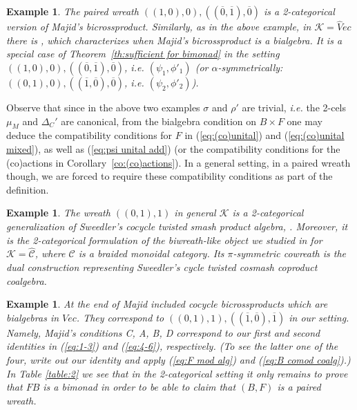 \documentclass[a4paper, 12pt]{article}
\renewcommand{\_}[1]{\mbox{$_{\left( #1 \right)}$}}
\theoremstyle{plain}
\newtheorem{ex}[thm]{Example}
\newcommand{\C}{{\mathcal C}}
\newcommand{\crta}{\overline}
\def\K{{\mathcal K}}  %
\newcommand{\exlabel}[1]{\label{ex:#1}}
\newcommand{\equref}[1]{(\ref{eq:#1})}
\newcommand{\thref}[1]{Theorem~\ref{th:#1}}
\newcommand{\coref}[1]{Corollary~\ref{co:#1}}
\begin{document}
\begin{ex} \exlabel{ex 2}
The paired wreath $((1,0),0), ((\crta 0,\crta 1),\crta 0)$ is a 2-categorical version of Majid's bicrossproduct. 
Similarly, as in the above example, in $\K=\hat Vec$ there is \cite[Theorem 3.3]{Maj5}, which characterizes when Majid's bicrossproduct is a bialgebra. 
It is a special case of \thref{sufficient for bimonad} in 
the setting $((1,0),0), ((\crta 0,\crta 1),\crta 0)$, {\em i.e.}  $(\psi_1, \phi'_1)$ (or $\alpha$-symmetrically: $((0,1),0), ((\crta 1,\crta 0),\crta 0)$, {\em i.e.}  $(\psi_2, \phi'_2)$). 
\end{ex}     


Observe that since in the above two examples $\sigma$ and $\rho'$ are trivial, {\em i.e.} the 2-cels $\mu_M$ and $\Delta_C'$ are canonical, from the bialgebra condition on 
$B\times F$ one may deduce the compatibility conditions for $F$ in \equref{(co)unital} and \equref{(co)unital mixed}, as well as \equref{psi unital add} (or the compatibility 
conditions for the (co)actions in \coref{(co)actions}). In a general setting, in a paired wreath though, we are forced to require these compatibility conditions as part of the definition. 


\begin{ex}
The wreath $((0,1),1)$ in general $\K$ is a 2-categorical generalization of Sweedler's cocycle twisted smash product algebra, \cite{Sw1}. Moreover, it is the 2-categorical formulation 
of the biwreath-like object we studied in \cite{Femic5} for $\K=\hat\C$, where $\C$ is a braided monoidal category. 
Its $\pi$-symmetric cowreath is the dual construction representing Sweedler's cycle twisted cosmash coproduct coalgebra. 
\end{ex}     



\begin{ex}
At the end of \cite{Maj6} Majid included {\em cocycle bicrossproducts} which are bialgebras in $Vec$. They correspond to $((0,1),1), ((\crta 1,\crta 0),\crta 1)$ 
in our setting. Namely, Majid's conditions C, A, B, D correspond to our first and second identities in \equref{1-3} and \equref{4-6}, respectively. 
(To see the latter one of the four, write out our identity and apply \equref{F mod alg} and \equref{B comod coalg}.)  
In Table \ref{table:2} we see that in the 2-categorical setting it only remains to prove that $FB$ is a bimonad in order to be able to claim that $(B,F)$ is 
a paired wreath.  
\end{ex}     
\end{document}
